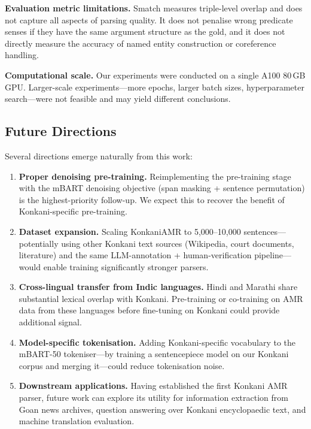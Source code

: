 \textbf{Evaluation metric limitations.} Smatch measures triple-level overlap and does not capture all aspects of parsing quality. It does not penalise wrong predicate senses if they have the same argument structure as the gold, and it does not directly measure the accuracy of named entity construction or coreference handling.

\textbf{Computational scale.} Our experiments were conducted on a single A100 80\,GB GPU. Larger-scale experiments—more epochs, larger batch sizes, hyperparameter search—were not feasible and may yield different conclusions.

\subsection{Future Directions}

Several directions emerge naturally from this work:

\begin{enumerate}
    \item \textbf{Proper denoising pre-training.} Reimplementing the pre-training stage with the mBART denoising objective (span masking + sentence permutation) is the highest-priority follow-up. We expect this to recover the benefit of Konkani-specific pre-training.

    \item \textbf{Dataset expansion.} Scaling KonkaniAMR to 5,000–10,000 sentences—potentially using other Konkani text sources (Wikipedia, court documents, literature) and the same LLM-annotation + human-verification pipeline—would enable training significantly stronger parsers.

    \item \textbf{Cross-lingual transfer from Indic languages.} Hindi and Marathi share substantial lexical overlap with Konkani. Pre-training or co-training on AMR data from these languages before fine-tuning on Konkani could provide additional signal.

    \item \textbf{Model-specific tokenisation.} Adding Konkani-specific vocabulary to the mBART-50 tokeniser—by training a sentencepiece model on our Konkani corpus and merging it—could reduce tokenisation noise.

    \item \textbf{Downstream applications.} Having established the first Konkani AMR parser, future work can explore its utility for information extraction from Goan news archives, question answering over Konkani encyclopaedic text, and machine translation evaluation.
\end{enumerate}

